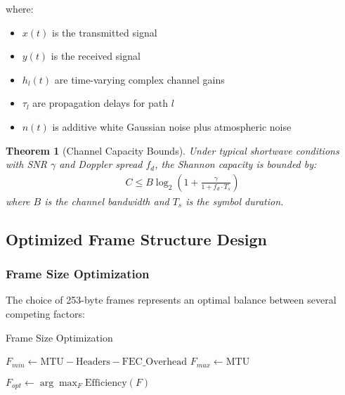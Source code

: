 \documentclass[11pt,a4paper]{article}
\newtheorem{theorem}{Theorem}[section]
\begin{document}
where:
\begin{itemize}
\item $x(t)$ is the transmitted signal
\item $y(t)$ is the received signal  
\item $h_l(t)$ are time-varying complex channel gains
\item $\tau_l$ are propagation delays for path $l$
\item $n(t)$ is additive white Gaussian noise plus atmospheric noise
\end{itemize}

\begin{theorem}[Channel Capacity Bounds]
Under typical shortwave conditions with SNR $\gamma$ and Doppler spread $f_d$, the Shannon capacity is bounded by:
\begin{align}
C \leq B \log_2\left(1 + \frac{\gamma}{1 + f_d \cdot T_s}\right)
\end{align}
where $B$ is the channel bandwidth and $T_s$ is the symbol duration.
\end{theorem}

\subsection{Optimized Frame Structure Design}

\subsubsection{Frame Size Optimization}

The choice of 253-byte frames represents an optimal balance between several competing factors:

\begin{algorithm}[H]
\SetAlgoLined
{}
\caption{Frame Size Optimization}

$F_{min} \leftarrow \text{MTU} - \text{Headers} - \text{FEC\_Overhead}$\;
$F_{max} \leftarrow \text{MTU}$\;


$F_{opt} \leftarrow \arg\max_F \text{Efficiency}(F)$\;
\;
\end{algorithm}
\end{document}
